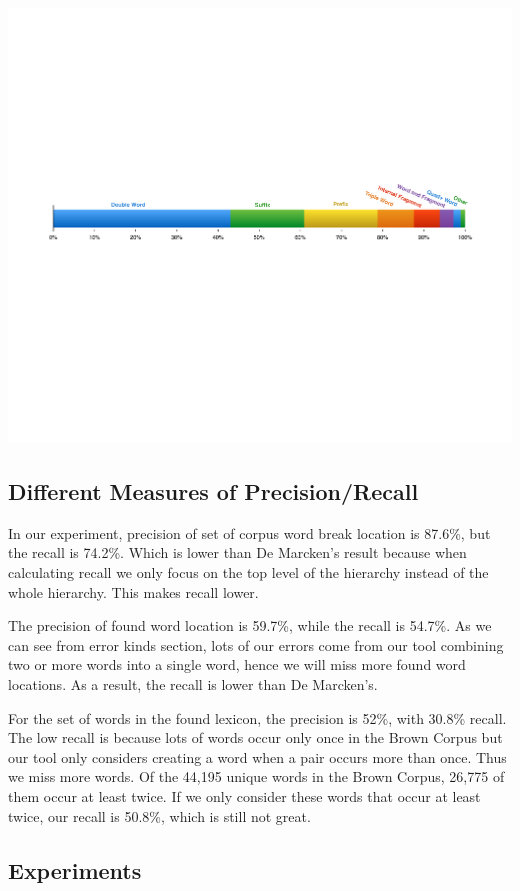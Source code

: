 \documentclass[11pt, oneside, fleqn]{article}
\begin{document}
  \includegraphics[scale=0.6]{./figure/error_nature_classfier.pdf}

  \subsection{Different Measures of Precision/Recall}
  
  In our experiment, precision of set of corpus word break location is 87.6\%, but the recall is 74.2\%. Which is lower than De Marcken's result because when calculating recall we only focus on the top level of the hierarchy instead of the whole hierarchy. This makes recall lower. 

  The precision of found word location is 59.7\%, while the recall is 54.7\%. As we can see from error kinds section, lots of our errors come from our tool combining two or more words into a single word, hence we will miss more found word locations. As a result, the recall is lower than De Marcken's. 
  
  For the set of words in the found lexicon, the precision is 52\%, with 30.8\% recall. The low recall is because lots of words occur only once in the Brown Corpus but our tool only considers creating a word when a pair occurs more than once. Thus we miss more words. Of the 44,195 unique words in the Brown Corpus, 26,775 of them occur at least twice. If we only consider these words that occur at least twice, our recall is 50.8\%, which is still not great.

  \subsection{Experiments}
  
\end{document}
